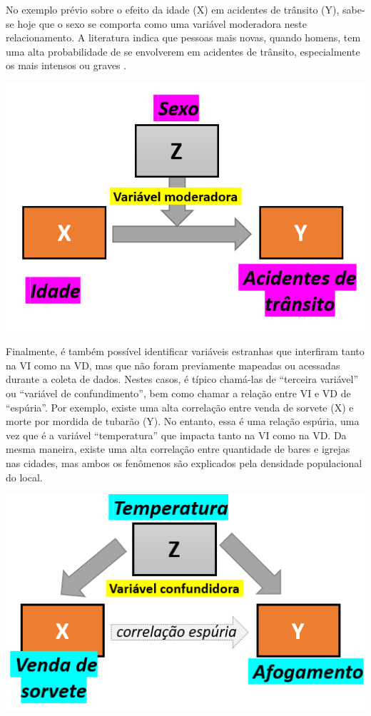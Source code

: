 \documentclass[
]{book}
\begin{document}
No exemplo prévio sobre o efeito da idade (X) em acidentes de trânsito (Y), sabe-se hoje que o sexo se comporta como uma variável moderadora neste relacionamento. A literatura indica que pessoas mais novas, quando homens, tem uma alta probabilidade de se envolverem em acidentes de trânsito, especialmente os mais intensos ou graves \citep{Amarasingha2014, PRB2006}.

\includegraphics{./img/cap_moderacao.png}

Finalmente, é também possível identificar variáveis estranhas que interfiram tanto na VI como na VD, mas que não foram previamente mapeadas ou acessadas durante a coleta de dados. Nestes casos, é típico chamá-las de ``terceira variável'' ou ``variável de confundimento'', bem como chamar a relação entre VI e VD de ``espúria''. Por exemplo, existe uma alta correlação entre venda de sorvete (X) e morte por mordida de tubarão (Y). No entanto, essa é uma relação espúria, uma vez que é a variável ``temperatura'' que impacta tanto na VI como na VD. Da mesma maneira, existe uma alta correlação entre quantidade de bares e igrejas nas cidades, mas ambos os fenômenos são explicados pela densidade populacional do local.

\includegraphics{./img/cap_confundimento.png}
\end{document}
